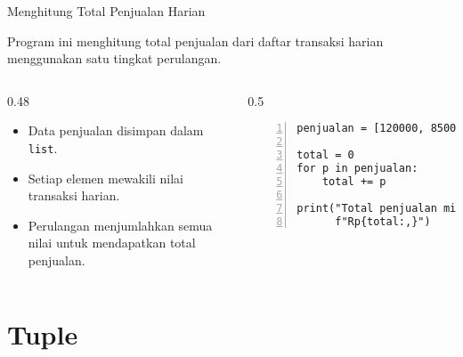 \documentclass[aspectratio=169, table]{beamer}
\begin{document}
\begin{frame}[fragile]{Menghitung Total Penjualan Harian}
\vspace{20pt}

Program ini menghitung total penjualan dari daftar transaksi harian menggunakan satu tingkat perulangan.

\begin{columns}[T]
  \begin{column}{0.48\textwidth}
    \begin{itemize}
      \item Data penjualan disimpan dalam \texttt{list}.
      \item Setiap elemen mewakili nilai transaksi harian.
      \item Perulangan menjumlahkan semua nilai untuk mendapatkan total penjualan.
    \end{itemize}
  \end{column}

  \begin{column}{0.5\textwidth}
    \begin{lstlisting}[style=PythonStyle, numbers=left, firstnumber=1]
penjualan = [120000, 85000, 95000, 110000, 130000]

total = 0
for p in penjualan:
    total += p

print("Total penjualan minggu ini:",
      f"Rp{total:,}")
    \end{lstlisting}
  \end{column}
\end{columns}

\end{frame}


\section{Tuple}
\end{document}
